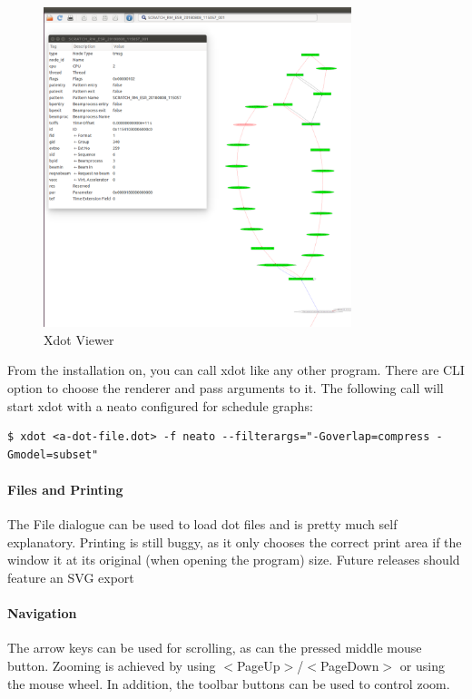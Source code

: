 \begin{figure}[H]
   \centering
   \includegraphics*[width=0.8\textwidth,keepaspectratio]{Figures/xdot}
   \caption{Xdot Viewer}
   \label{fig:xdot}
\end{figure}
%
From the installation on, you can call xdot like any other program. There are CLI option to choose the renderer and pass arguments to it. The following call will start xdot with a neato configured for schedule graphs:
%
\begin{lstlisting}[style = customshell]
$ xdot <a-dot-file.dot> -f neato --filterargs="-Goverlap=compress -Gmodel=subset"
\end{lstlisting}

\paragraph{Files and Printing}
The File dialogue can be used to load dot files and is pretty much self explanatory. Printing is still buggy, as it only chooses the correct print area if the window it at its original (when opening the program) size.
Future releases should feature an SVG export

\paragraph{Navigation}
The arrow keys can be used for scrolling, as can the pressed middle mouse button. Zooming is achieved by using $<$PageUp$>$/$<$PageDown$>$ or using the mouse wheel.
In addition, the toolbar buttons can be used to control zoom.
%
